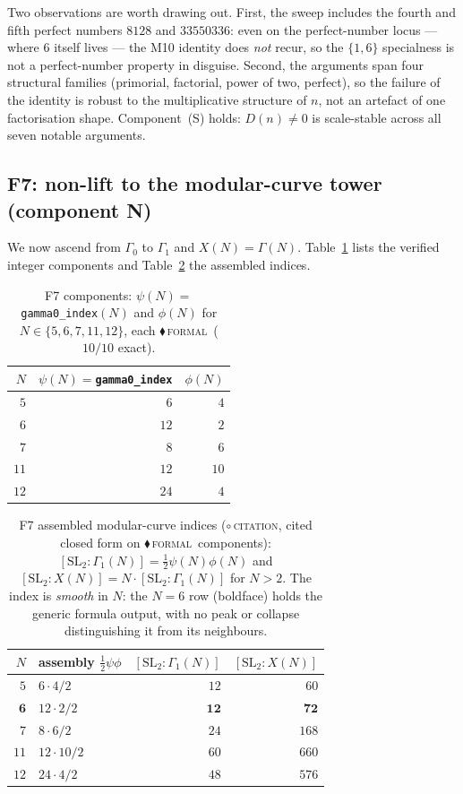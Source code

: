 \documentclass[11pt,a4paper]{article}
\newcommand{\Dn}{D(n)}
\newcommand{\tierF}{\textcolor{blue!60!black}{$\blacklozenge$}\,\textsc{formal}}
\newcommand{\tierC}{\textcolor{orange!85!black}{$\circ$}\,\textsc{citation}}
\theoremstyle{definition}
\begin{document}
Two observations are worth drawing out. First, the sweep includes the fourth and
fifth perfect numbers $8128$ and $33550336$: even on the perfect-number locus
--- where $6$ itself lives --- the M10 identity does \emph{not} recur, so the
$\{1,6\}$ specialness is not a perfect-number property in disguise. Second, the
arguments span four structural families (primorial, factorial, power of two,
perfect), so the failure of the identity is robust to the multiplicative
structure of $n$, not an artefact of one factorisation shape. Component~(S)
holds: $\Dn\neq0$ is scale-stable across all seven notable arguments.

\subsection{F7: non-lift to the modular-curve tower (component N)}
\label{sec:verif-f7}

We now ascend from $\Gamma_0$ to $\Gamma_1$ and $X(N)=\Gamma(N)$.
Table~\ref{tab:f7-comp} lists the verified integer components and
Table~\ref{tab:f7-idx} the assembled indices.

\begin{table}[h]
\centering
\caption{F7 components: $\psi(N)=$ \texttt{gamma0\_index}$(N)$ and $\phi(N)$ for
$N\in\{5,6,7,11,12\}$, each \tierF\ ($10/10$ exact).}
\label{tab:f7-comp}
\small
\begin{tabular}{@{}rrr@{}}
\toprule
$N$ & $\psi(N)=$\texttt{gamma0\_index} & $\phi(N)$ \\
\midrule
$5$  & $6$  & $4$  \\
$6$  & $12$ & $2$  \\
$7$  & $8$  & $6$  \\
$11$ & $12$ & $10$ \\
$12$ & $24$ & $4$  \\
\bottomrule
\end{tabular}
\end{table}

\begin{table}[h]
\centering
\caption{F7 assembled modular-curve indices (\tierC, cited closed form on
\tierF\ components): $[\mathrm{SL}_2:\Gamma_1(N)]=\tfrac12\psi(N)\phi(N)$ and
$[\mathrm{SL}_2:X(N)]=N\cdot[\mathrm{SL}_2:\Gamma_1(N)]$ for $N>2$. The index is
\emph{smooth} in $N$: the $N=6$ row (boldface) holds the generic formula output,
with no peak or collapse distinguishing it from its neighbours.}
\label{tab:f7-idx}
\small
\begin{tabular}{@{}rlrr@{}}
\toprule
$N$ & assembly $\tfrac12\psi\phi$ & $[\mathrm{SL}_2:\Gamma_1(N)]$ & $[\mathrm{SL}_2:X(N)]$ \\
\midrule
$5$           & $6\cdot4/2$   & $12$ & $60$  \\
$\mathbf{6}$  & $12\cdot2/2$  & $\mathbf{12}$ & $\mathbf{72}$  \\
$7$           & $8\cdot6/2$   & $24$ & $168$ \\
$11$          & $12\cdot10/2$ & $60$ & $660$ \\
$12$          & $24\cdot4/2$  & $48$ & $576$ \\
\bottomrule
\end{tabular}
\end{table}
\end{document}
